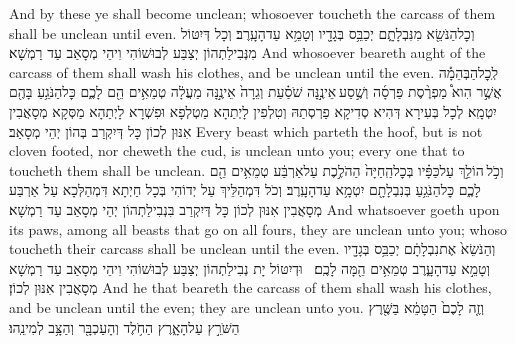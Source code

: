 {And by these ye shall become unclean; whosoever toucheth the carcass of them shall be unclean until even.}{}
{וְכׇל\maqqaf הַנֹּשֵׂ֖א מִנִּבְלָתָ֑ם יְכַבֵּ֥ס בְּגָדָ֖יו וְטָמֵ֥א עַד\maqqaf הָעָֽרֶב׃}
{וְכָל דְּיִטּוֹל מִנְּבִילַתְהוֹן יְצַבַּע לְבוּשׁוֹהִי וִיהֵי מְסָאַב עַד רַמְשָׁא׃}
{And whosoever beareth aught of the carcass of them shall wash his clothes, and be unclean until the even.}{}
{לְֽכׇל\maqqaf הַבְּהֵמָ֡ה אֲשֶׁ֣ר הִוא֩ מַפְרֶ֨סֶת פַּרְסָ֜ה וְשֶׁ֣סַע \legarmeh  אֵינֶ֣נָּה שֹׁסַ֗עַת וְגֵרָה֙ אֵינֶ֣נָּה מַעֲלָ֔ה טְמֵאִ֥ים הֵ֖ם לָכֶ֑ם כׇּל\maqqaf הַנֹּגֵ֥עַ בָּהֶ֖ם יִטְמָֽא׃}
{לְכָל בְּעִירָא דְּהִיא סְדִיקָא פַרְסְתַהּ וְטִלְפִין לָיְתַהָא מַטְלְפָא וּפִשְׁרָא לָיְתַהָא מַסְּקָא מְסָאֲבִין אִנּוּן לְכוֹן כָּל דְּיִקְרַב בְּהוֹן יְהֵי מְסָאַב׃}
{Every beast which parteth the hoof, but is not cloven footed, nor cheweth the cud, is unclean unto you; every one that to toucheth them shall be unclean.}{}
{וְכֹ֣ל \legarmeh  הוֹלֵ֣ךְ עַל\maqqaf כַּפָּ֗יו בְּכׇל\maqqaf הַֽחַיָּה֙ הַהֹלֶ֣כֶת עַל\maqqaf אַרְבַּ֔ע טְמֵאִ֥ים הֵ֖ם לָכֶ֑ם כׇּל\maqqaf הַנֹּגֵ֥עַ בְּנִבְלָתָ֖ם יִטְמָ֥א עַד\maqqaf הָעָֽרֶב׃}
{וְכֹל דִּמְהַלֵּיךְ עַל יְדוֹהִי בְּכָל חַיְתָא דִּמְהַלְּכָא עַל אַרְבַּע מְסָאֲבִין אִנּוּן לְכוֹן כָּל דְּיִקְרַב בִּנְבִילַתְהוֹן יְהֵי מְסָאַב עַד רַמְשָׁא׃}
{And whatsoever goeth upon its paws, among all beasts that go on all fours, they are unclean unto you; whoso toucheth their carcass shall be unclean until the even.}{}
{וְהַנֹּשֵׂא֙ אֶת\maqqaf נִבְלָתָ֔ם יְכַבֵּ֥ס בְּגָדָ֖יו וְטָמֵ֣א עַד\maqqaf הָעָ֑רֶב טְמֵאִ֥ים הֵ֖מָּה לָכֶֽם׃ \setuma }
{וּדְיִטּוֹל יָת נְבִילַתְהוֹן יְצַבַּע לְבוּשׁוֹהִי וִיהֵי מְסָאַב עַד רַמְשָׁא מְסָאֲבִין אִנּוּן לְכוֹן׃}
{And he that beareth the carcass of them shall wash his clothes, and be unclean until the even; they are unclean unto you.}{}
{וְזֶ֤ה לָכֶם֙ הַטָּמֵ֔א בַּשֶּׁ֖רֶץ הַשֹּׁרֵ֣ץ עַל\maqqaf הָאָ֑רֶץ הַחֹ֥לֶד וְהָעַכְבָּ֖ר וְהַצָּ֥ב לְמִינֵֽהוּ׃}
